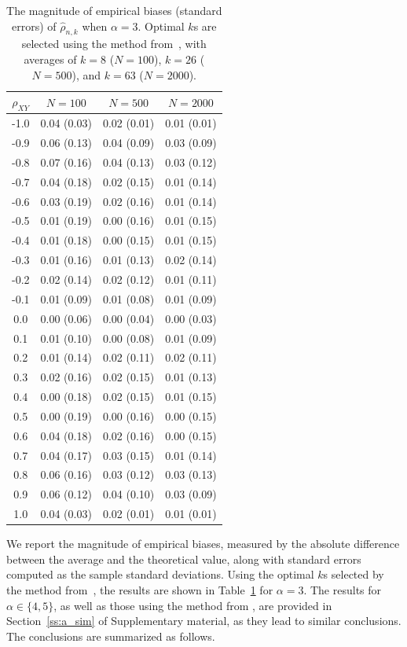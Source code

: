\documentclass[lineno]{biometrika}
\newcommand \ag{\alpha}
\begin{document}
\begin{table}[t]
\centering
\caption{The magnitude of empirical biases (standard errors) of $\hat{\rho}_{n,k}$ when $\ag=3$. Optimal $k$s are selected using the method from~\citet{danielsson:Ergun:deHaan:deVries:2016}, with averages of $k=8$ ($N=100$), $k=26$ ($N=500$), and  $k=63$ ($N=2000$).
\label{t:sim2}}
\medskip
\begin{tabular}{cccc}
  \hline\hline
 $\rho_{XY}$ & $N=100$ &  $N=500$ & $N=2000$  \\
  \hline
-1.0 & 0.04 (0.03) & 0.02 (0.01) & 0.01 (0.01) \\
-0.9 & 0.06 (0.13) & 0.04 (0.09) & 0.03 (0.09) \\
-0.8 & 0.07 (0.16) & 0.04 (0.13) & 0.03 (0.12) \\
-0.7 & 0.04 (0.18) & 0.02 (0.15) & 0.01 (0.14) \\
-0.6 & 0.03 (0.19) & 0.02 (0.16) & 0.01 (0.14) \\
-0.5 & 0.01 (0.19) & 0.00 (0.16) & 0.01 (0.15) \\
-0.4 & 0.01 (0.18) & 0.00 (0.15) & 0.01 (0.15) \\
-0.3 & 0.01 (0.16) & 0.01 (0.13) & 0.02 (0.14) \\
-0.2 & 0.02 (0.14) & 0.02 (0.12) & 0.01 (0.11) \\
-0.1 & 0.01 (0.09) & 0.01 (0.08) & 0.01 (0.09) \\
0.0 & 0.00 (0.06) & 0.00 (0.04) & 0.00 (0.03) \\
0.1 & 0.01 (0.10) & 0.00 (0.08) & 0.01 (0.09) \\
0.2 & 0.01 (0.14) & 0.02 (0.11) & 0.02 (0.11) \\
0.3 & 0.02 (0.16) & 0.02 (0.15) & 0.01 (0.13) \\
0.4 & 0.00 (0.18) & 0.02 (0.15) & 0.01 (0.15) \\
0.5 & 0.00 (0.19) & 0.00 (0.16) & 0.00 (0.15) \\
0.6 & 0.04 (0.18) & 0.02 (0.16) & 0.00 (0.15) \\
0.7 & 0.04 (0.17) & 0.03 (0.15) & 0.01 (0.14) \\
0.8 & 0.06 (0.16) & 0.03 (0.12) & 0.03 (0.13) \\
0.9 & 0.06 (0.12) & 0.04 (0.10) & 0.03 (0.09) \\
1.0 & 0.04 (0.03) & 0.02 (0.01) & 0.01 (0.01) \\
\hline\hline
\end{tabular}
\end{table}

We report the magnitude of empirical biases, measured by the absolute difference between the average and the theoretical value, along with standard errors computed as the sample standard deviations.
Using the optimal $k$s selected by the method from~\citet{danielsson:Ergun:deHaan:deVries:2016}, the results are shown in Table~\ref{t:sim2} for $\alpha = 3$. The results for $\ag \in \{4,5\}$, as well as those using the method from \citet{clauset:shalizi:newman:2009}, are provided in Section~\ref{ss:a_sim} of Supplementary material, as they lead to similar conclusions. The conclusions are summarized as follows.
\end{document}
